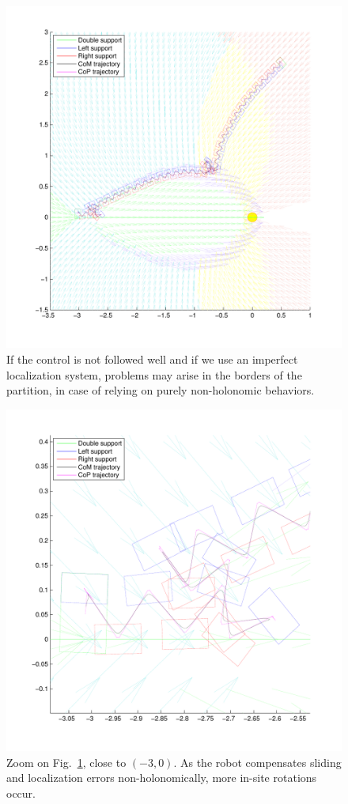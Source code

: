\begin{figure}[ht]
\centering
\includegraphics[scale=0.8  ]{Chap5-Visual-Planning/steps10.pdf}
\caption{If the control is not followed well and if we use an imperfect localization system, problems may arise in the borders of the partition, in case of relying on purely non-holonomic behaviors.}
\label{fig:steps10}
\end{figure}

\begin{figure}[ht]
\centering
\includegraphics[scale=0.55]{Chap5-Visual-Planning/steps10zoom.pdf}
\caption{Zoom on Fig.~\ref{fig:steps10}, close to $(-3,0)$. As the robot compensates sliding and localization errors non-holonomically, more in-site rotations occur.}
\label{fig:steps10zoom}
\end{figure}


